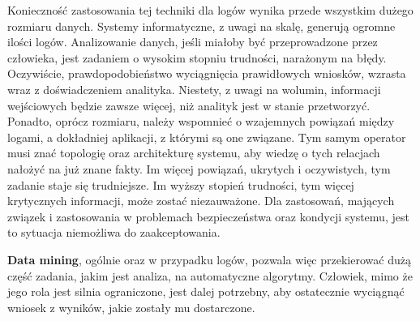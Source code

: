         Konieczność zastosowania tej techniki dla logów wynika przede wszystkim dużego rozmiaru danych. 
        Systemy informatyczne, z uwagi na skalę, generują ogromne ilości
        logów. Analizowanie danych, jeśli miałoby być przeprowadzone przez człowieka, jest zadaniem
        o wysokim stopniu trudności, narażonym na błędy. Oczywiście, prawdopodobieństwo wyciągnięcia
        prawidłowych wniosków, wzrasta wraz z doświadczeniem analityka. Niestety, z uwagi na wolumin,
        informacji wejściowych będzie zawsze więcej, niż analityk jest w stanie przetworzyć. Ponadto, 
        oprócz rozmiaru, należy wspomnieć o wzajemnych powiązań między logami, a dokładniej
        aplikacji, z którymi są one związane. Tym samym operator musi znać topologię oraz
        architekturę systemu, aby wiedzę o tych relacjach nałożyć na już znane fakty. Im więcej powiązań,
        ukrytych i oczywistych, tym zadanie staje się trudniejsze. Im wyższy stopień trudności,
        tym więcej krytycznych informacji, może zostać niezauważone. Dla zastosowań, mających związek i zastosowania
        w problemach bezpieczeństwa oraz kondycji systemu, jest to sytuacja niemożliwa do zaakceptowania.
        
        \textbf{Data mining}, ogólnie oraz w przypadku logów, pozwala więc przekierować dużą część zadania, jakim
        jest analiza, na automatyczne algorytmy. Człowiek, mimo że jego rola jest silnia ograniczone, jest
        dalej potrzebny, aby ostatecznie wyciągnąć wniosek z wyników, jakie zostały mu dostarczone.